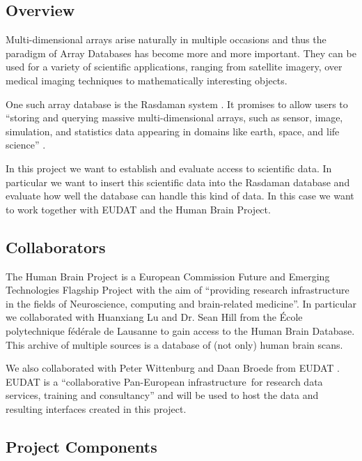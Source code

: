 \label{sec:intro}

\subsection{Overview}

Multi-dimensional arrays arise naturally in multiple occasions and thus the paradigm of Array Databases has become more and more important. They can be used for a variety of scientific applications, ranging from satellite imagery, over medical imaging techniques to mathematically interesting objects. 

One such array database is the Rasdaman system \cite{rasdaman:intropaper}. It promises to allow users to ``storing and querying massive multi-dimensional arrays, such as sensor, image, simulation, and statistics data appearing in domains like earth, space, and life science'' \cite{rasdaman:website}. 

In this project we want to establish and evaluate access to scientific data. In particular we want to insert this scientific data into the Rasdaman database and evaluate how well the database can handle this kind of data. In this case we want to work together with EUDAT and the Human Brain Project. 

\subsection{Collaborators}

The Human Brain Project \cite{hbp:website} is a European Commission Future and Emerging Technologies Flagship Project with the aim of ``providing research infrastructure in the fields of Neuroscience, computing and brain-related medicine''. In particular we collaborated with Huanxiang Lu and Dr. Sean Hill from the École polytechnique fédérale de Lausanne to gain access to the Human Brain Database. This archive of multiple sources is a database of (not only) human brain scans. 

We also collaborated with Peter Wittenburg and Daan Broede from EUDAT \cite{eudat:website}. EUDAT is a ``collaborative Pan-European infrastructure for research data services, training and consultancy'' and will be used to host the data and resulting interfaces created in this project. 

\subsection{Project Components}

